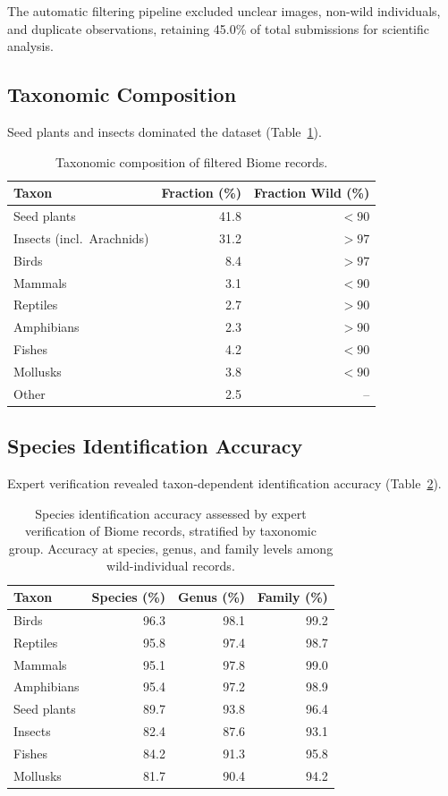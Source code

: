\documentclass[11pt]{article}
\begin{document}
The automatic filtering pipeline excluded unclear images, non-wild individuals, and duplicate observations, retaining 45.0\% of total submissions for scientific analysis.

\subsection{Taxonomic Composition}

Seed plants and insects dominated the dataset (Table~\ref{tab:composition}).

\begin{table}[H]
\centering
\caption{Taxonomic composition of filtered Biome records.}
\label{tab:composition}
\begin{tabular}{lrr}
\toprule
\textbf{Taxon} & \textbf{Fraction (\%)} & \textbf{Fraction Wild (\%)} \\
\midrule
Seed plants & 41.8 & $<90$ \\
Insects (incl.\ Arachnids) & 31.2 & $>97$ \\
Birds & 8.4 & $>97$ \\
Mammals & 3.1 & $<90$ \\
Reptiles & 2.7 & $>90$ \\
Amphibians & 2.3 & $>90$ \\
Fishes & 4.2 & $<90$ \\
Mollusks & 3.8 & $<90$ \\
Other & 2.5 & -- \\
\bottomrule
\end{tabular}
\end{table}

\subsection{Species Identification Accuracy}

Expert verification revealed taxon-dependent identification accuracy (Table~\ref{tab:accuracy}).

\begin{table}[H]
\centering
\caption{Species identification accuracy assessed by expert verification of Biome records, stratified by taxonomic group. Accuracy at species, genus, and family levels among wild-individual records.}
\label{tab:accuracy}
\begin{tabular}{lrrr}
\toprule
\textbf{Taxon} & \textbf{Species (\%)} & \textbf{Genus (\%)} & \textbf{Family (\%)} \\
\midrule
Birds & 96.3 & 98.1 & 99.2 \\
Reptiles & 95.8 & 97.4 & 98.7 \\
Mammals & 95.1 & 97.8 & 99.0 \\
Amphibians & 95.4 & 97.2 & 98.9 \\
Seed plants & 89.7 & 93.8 & 96.4 \\
Insects & 82.4 & 87.6 & 93.1 \\
Fishes & 84.2 & 91.3 & 95.8 \\
Mollusks & 81.7 & 90.4 & 94.2 \\
\bottomrule
\end{tabular}
\end{table}
\end{document}
